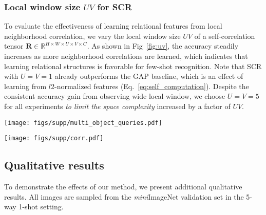 \documentclass[10pt,twocolumn,letterpaper]{article}
\newcommand{\itmini}{\textit{mini}}
\newcommand{\Real}{\mathbb{R}}
\newcommand{\bC}{\mathbf{C}}
\newcommand{\bR}{\mathbf{R}}
\newcommand{\abbself}{SCR\xspace}
\newcommand{\abbcross}{CCA\xspace}
\begin{document}
\subsubsection{Local window size $UV$ for \abbself}
To evaluate the effectiveness of learning relational features from local neighborhood correlation, we vary the local window size $UV$ of a self-correlation tensor $\bR \in \Real^{H \times W \times U \times V \times C}$.
As shown in Fig~\ref{fig:uv}, the accuracy steadily increases as more neighborhood correlations are learned, which indicates that learning relational structures is favorable for few-shot recognition.
Note that \abbself with $U = V = 1$ already outperforms the GAP baseline, which is an effect of learning from $l$2-normalized features (Eq.~\ref{eq:self_computation}).
Despite the consistent accuracy gain from observing wide local window, we choose $U = V = 5$ for all experiments \textit{to limit the space complexity} increased by a factor of $UV$.








\begin{figure*}[t!]
\centering
\texttt{[image: figs/supp/multi\_object\_queries.pdf]}
\caption{\textbf{Co-attention maps on multi-object queries on \itmini ImageNet}.
The proposed \abbcross module can adaptively capture multiple objects in a query depending on the context of each support instance. 
\label{fig:multi_object_queries}}
\end{figure*} 








\begin{figure*}[t!]
\centering
\texttt{[image: figs/supp/corr.pdf]}
\caption{\textbf{Visualization of cross-correlation on \itmini ImageNet}.
\textbf{(a)}: Top 10 matches in $\bC$ (initial cross-correlation). \textbf{(b)}: Top 10 matches in $\hat{\bC} = h(\bC)$ (refined cross-correlation).
Unreliable matches are filtered through $h(\cdot)$.
\label{fig:corr}}
\end{figure*} 








\subsection{Qualitative results}
To demonstrate the effects of our method, we present additional qualitative results.
All images are sampled from the \itmini ImageNet validation set in the 5-way 1-shot setting.
\end{document}
